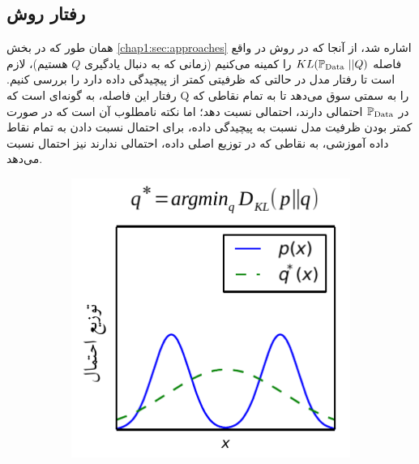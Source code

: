 \subsection{ 
    رفتار \meanseeking{} روش \maxlikelihood{}}
همان طور که در بخش \ref{chap1:sec:approaches} اشاره شد، از آنجا که در روش \maxlikelihood{} در واقع فاصله $KL(\mathbb P_\text{Data} ~ || Q)$ را کمینه می‌کنیم (زمانی که به دنبال یادگیری $Q$ هستیم)، لازم است تا رفتار مدل در حالتی که ظرفیتی کمتر از پیچیدگی داده دارد را بررسی کنیم. رفتار این فاصله، به گونه‌ای است که Q را به سمتی سوق می‌دهد تا به تمام نقاطی که در $\mathbb P_\text{Data}$ احتمالی دارند، احتمالی نسبت دهد؛ اما نکته نامطلوب آن است که در صورت کمتر بودن ظرفیت مدل نسبت به پیچیدگی داده، برای احتمال نسبت دادن به تمام نقاط داده آموزشی، به نقاطی که در توزیع اصلی داده، احتمالی ندارند نیز احتمال نسبت می‌دهد.
\begin{figure}[h]
	\centering
	\begin{subfigure}[t!]{.4\textwidth}
		\centering
		\includegraphics[height=1.\textwidth]{images/KLvsReverseKL_KL.pdf}
		\caption{}
		\label{fig:meanseeking_KL}
	\end{subfigure}
	\begin{subfigure}[t!]{.4\textwidth}
		\centering

\end{subfigure}
\end{figure}
